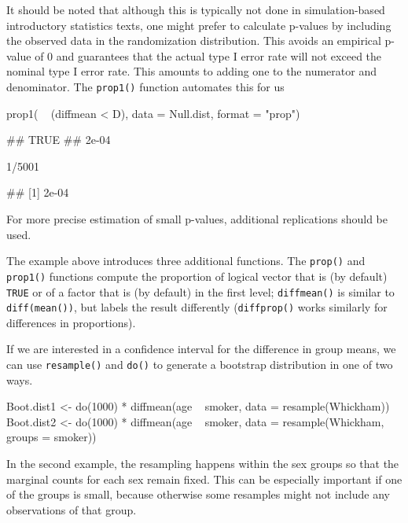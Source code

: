 It should be noted that although this is typically not done in
simulation-based introductory statistics texts, one might prefer to
calculate p-values by including the observed data in the randomization
distribution. This avoids an empirical p-value of 0 and guarantees that
the actual type I error rate will not exceed the nominal type I error
rate. This amounts to adding one to the numerator and denominator. The
\texttt{prop1()} function automates this for us

\begin{Schunk}
\begin{Sinput}
prop1( ~ (diffmean < D), data = Null.dist, format = "prop")
\end{Sinput}
\begin{Soutput}
##  TRUE 
## 2e-04
\end{Soutput}
\begin{Sinput}
1/5001
\end{Sinput}
\begin{Soutput}
## [1] 2e-04
\end{Soutput}
\end{Schunk}

\noindent
For more precise estimation of small p-values, additional replications
should be used.

The example above introduces three additional  functions.
The \texttt{prop()} and \texttt{prop1()} functions compute the
proportion of logical vector that is (by default) \texttt{TRUE} or of a
factor that is (by default) in the first level; \texttt{diffmean()} is
similar to \texttt{diff(mean())}, but labels the result differently
(\texttt{diffprop()} works similarly for differences in proportions).

If we are interested in a confidence interval for the difference in
group means, we can use \texttt{resample()} and \texttt{do()} to
generate a bootstrap distribution in one of two ways.

\begin{Schunk}
\begin{Sinput}
Boot.dist1 <- do(1000) * diffmean(age ~ smoker, data = resample(Whickham))
Boot.dist2 <- do(1000) * diffmean(age ~ smoker, data = resample(Whickham, groups = smoker))
\end{Sinput}
\end{Schunk}

\noindent
In the second example, the resampling happens within the sex groups so
that the marginal counts for each sex remain fixed. This can be
especially important if one of the groups is small, because otherwise
some resamples might not include any observations of that group.

